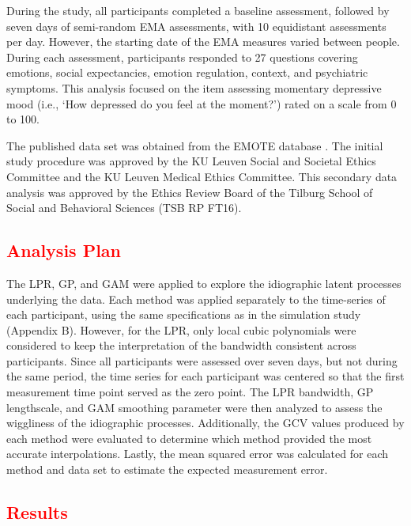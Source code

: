 \documentclass[man, floatsintext]{apa7}
\begin{document}
During the study, all participants completed a baseline assessment, followed by
seven days of semi-random EMA assessments, with 10 equidistant assessments per
day. However, the starting date of the EMA measures varied between people.
During each assessment, participants responded to 27 questions covering
emotions, social expectancies, emotion regulation, context, and psychiatric
symptoms. This analysis focused on the item assessing momentary depressive mood
(i.e., `How depressed do you feel at the moment?') rated on a scale from 0 to
100.

The published data set was obtained from the EMOTE database
\parencite{kalokerinos_emote_nodate}. The initial study procedure was approved
by the KU Leuven Social and Societal Ethics Committee and the KU Leuven Medical
Ethics Committee. This secondary data analysis was approved by the Ethics
Review Board of the Tilburg School of Social and Behavioral Sciences (TSB RP
FT16).

\subsection{\textcolor{red}{Analysis Plan}}

The LPR, GP, and GAM were applied to explore the idiographic latent processes
underlying the data. Each method was applied separately to the time-series of
each participant, using the same specifications as in the simulation study
(Appendix B). However, for the LPR, only local cubic polynomials were
considered to keep the interpretation of the bandwidth consistent across
participants. Since all participants were assessed over seven days, but not
during the same period, the time series for each participant was centered so
that the first measurement time point served as the zero point. The LPR
bandwidth, GP lengthscale, and GAM smoothing parameter were then analyzed to
assess the wiggliness of the idiographic processes. Additionally, the GCV
values produced by each method were evaluated to determine which method
provided the most accurate interpolations. Lastly, the mean squared error was
calculated for each method and data set to estimate the expected measurement
error.

\subsection{\textcolor{red}{Results}}
\end{document}
